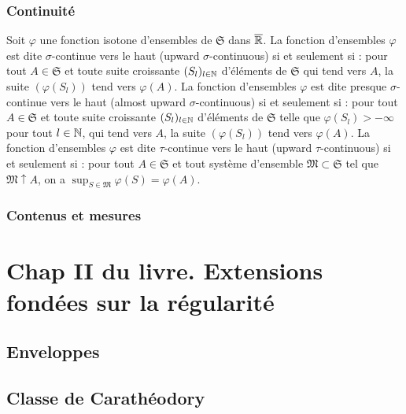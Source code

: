 \subsubsection{Continuité} \label{Continuite}
Soit $\varphi$ une fonction isotone d'ensembles de $\mathfrak{S}$ dans $\overline{\mathbb{R}}$.\newline
La fonction d'ensembles $\varphi$ est dite $\sigma$-continue vers le haut (upward $\sigma$-continuous) si et seulement si : pour tout $A \in \mathfrak{S}$ et toute suite croissante $(S_l)_{l\in \mathbb{N}}$ d'éléments de $\mathfrak{S}$ qui tend vers $A$, la suite $(\varphi(S_l))$ tend vers $\varphi(A)$.\newline
La fonction d'ensembles $\varphi$ est dite presque $\sigma$-continue vers le haut (almost upward $\sigma$-continuous) si et seulement si : pour tout $A \in \mathfrak{S}$ et toute suite croissante $(S_l)_{l\in \mathbb{N}}$ d'éléments de $\mathfrak{S}$ telle que $\varphi(S_l)> - \infty$ pour tout $l\in \mathbb{N}$, qui tend vers $A$, la suite $(\varphi(S_l))$ tend vers $\varphi(A)$.\newline
La fonction d'ensembles $\varphi$ est dite $\tau$-continue vers le haut (upward $\tau$-continuous) si et seulement si :
pour tout $A \in \mathfrak{S}$ et tout système d'ensemble $\mathfrak{M} \subset \mathfrak{S}$ tel que $\mathfrak{M} \uparrow A$, on a $\sup_{S \in \mathfrak{M}}\varphi(S) = \varphi(A)$.

\subsubsection{Contenus et mesures} \label{ContenusMesures}

\section{Chap II du livre. Extensions fondées sur la régularité}\label{ExtenRegul}
\subsection{Enveloppes}\label{Enveloppes}
\subsection{Classe de Carathéodory} \label{ClasseCaratheodory}


